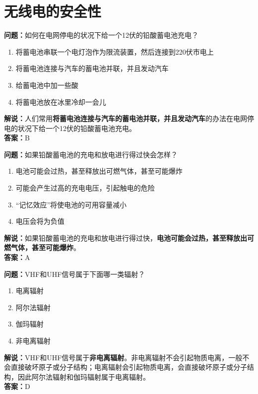 \chapter{无线电的安全性}


\textbf{问题：}如何在电网停电的状况下给一个12伏的铅酸蓄电池充电？

\begin{enumerate}[label=\Alph*), leftmargin=1.5cm]	
	\item 将蓄电池串联一个电灯泡作为限流装置，然后连接到220伏市电上
	\item 将蓄电池连接与汽车的蓄电池并联，并且发动汽车
	\item 给蓄电池中加一些酸
	\item 将蓄电池放在冰里冷却一会儿
\end{enumerate}

\textbf{解说：}人们常用\textbf{将蓄电池连接与汽车的蓄电池并联，并且发动汽车}的办法在电网停电的状况下给一个12伏的铅酸蓄电池充电。\\\textbf{答案：}B%


\textbf{问题：}如果铅酸蓄电池的充电和放电进行得过快会怎样？

\begin{enumerate}[label=\Alph*), leftmargin=1.5cm]
	\item 电池可能会过热，甚至释放出可燃气体，甚至可能爆炸
	\item 可能会产生过高的充电电压，引起触电的危险
	\item “记忆效应”将使电池的可用容量减小
	\item 电压会将为负值
\end{enumerate}

\textbf{解说：}如果铅酸蓄电池的充电和放电进行得过快，\textbf{电池可能会过热，甚至释放出可燃气体，甚至可能爆炸}。\\\textbf{答案：}A%


\textbf{问题：}VHF和UHF信号属于下面哪一类辐射？

\begin{enumerate}[label=\Alph*), leftmargin=1.5cm]
	\item 电离辐射
	\item 阿尔法辐射
	\item 伽玛辐射
	\item 非电离辐射
\end{enumerate}

\textbf{解说：}VHF和UHF信号属于\textbf{非电离辐射}。非电离辐射不会引起物质电离，一般不会直接破坏原子或分子结构；电离辐射会引起物质电离，会直接破坏原子或分子结构，因此阿尔法辐射和伽玛辐射属于电离辐射。\\\textbf{答案：}D


